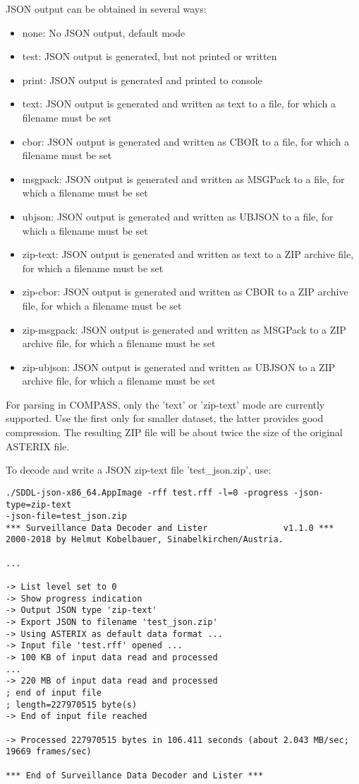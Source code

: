 JSON output can be obtained in several ways:
\begin{itemize}
\item none: No JSON output, default mode
\item test: JSON output is generated, but not printed or written
\item print: JSON output is generated and printed to console
\item text: JSON output is generated and written as text to a file, for which a filename must be set
\item cbor: JSON output is generated and written as CBOR to a file, for which a filename must be set
\item msgpack: JSON output is generated and written as MSGPack to a file, for which a filename must be set
\item ubjson: JSON output is generated and written as UBJSON to a file, for which a filename must be set
\item zip-text: JSON output is generated and written as text to a ZIP archive file, for which a filename must be set
\item zip-cbor: JSON output is generated and written as CBOR to a ZIP archive file, for which a filename must be set
\item zip-msgpack: JSON output is generated and written as MSGPack to a ZIP archive file, for which a filename must be set
\item zip-ubjson: JSON output is generated and written as UBJSON to a ZIP archive file, for which a filename must be set
\end{itemize}

For parsing in COMPASS, only the 'text' or 'zip-text' mode are currently supported. Use the first only for smaller dataset, the latter provides good compression. The resulting ZIP file will be about twice the size of the original ASTERIX file.

To decode and write a JSON zip-text file 'test\_json.zip', use:
\begin{lstlisting}
./SDDL-json-x86_64.AppImage -rff test.rff -l=0 -progress -json-type=zip-text 
-json-file=test_json.zip
*** Surveillance Data Decoder and Lister			   v1.1.0 ***
2000-2018 by Helmut Kobelbauer, Sinabelkirchen/Austria.

...

-> List level set to 0
-> Show progress indication
-> Output JSON type 'zip-text'
-> Export JSON to filename 'test_json.zip'
-> Using ASTERIX as default data format ...
-> Input file 'test.rff' opened ...
-> 100 KB of input data read and processed
...
-> 220 MB of input data read and processed
; end of input file
; length=227970515 byte(s)
-> End of input file reached

-> Processed 227970515 bytes in 106.411 seconds (about 2.043 MB/sec; 19669 frames/sec)

*** End of Surveillance Data Decoder and Lister ***
\end{lstlisting}

